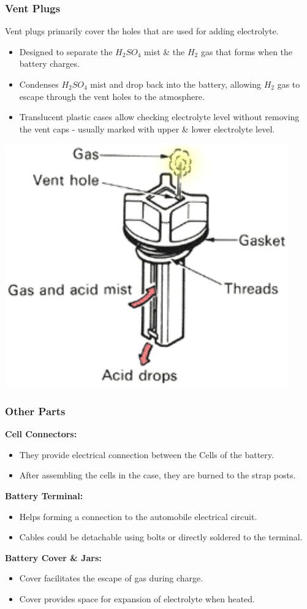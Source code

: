\documentclass{beamer}
\begin{document}
\begin{frame}    %
  \frametitle{Vent Plugs}
  \fontsize{7pt}{10}\selectfont
  
  \begin{center}
    Vent plugs primarily cover the holes that are used for adding electrolyte.
  \end{center}
  
  \begin{itemize}
    \item Designed to separate the $H_{2}SO_{4}$ mist \& the $H_{2}$ gas that forms when the battery charges.
    \item Condenses $H_{2}SO_{4}$ mist and drop back into the battery, allowing $H_{2}$ gas to escape through the vent holes to the atmosphere.
    \item Translucent plastic cases allow checking electrolyte level without removing the vent caps - usually marked with upper \& lower electrolyte level.
  \end{itemize}
  
  \begin{center}
    \includegraphics[width=0.4\linewidth]{./Resources/Images/vent_plug.jpg}
  \end{center}
  
\end{frame}

\begin{frame}    %
  \frametitle{Other Parts}
  \fontsize{10pt}{16}\selectfont

  \textbf{Cell Connectors:}  
  \begin{itemize}
    \item They provide electrical connection between the Cells of the battery.
    \item After assembling the cells in the case, they are burned to the strap posts.
  \end{itemize}
  
  \textbf{Battery Terminal:}
  \begin{itemize}
    \item Helps forming a connection to the automobile electrical circuit.
    \item Cables could be detachable using bolts or directly soldered to the terminal.
  \end{itemize}
  
  \textbf{Battery Cover \& Jars:}
  \begin{itemize}
    \item Cover facilitates the escape of gas during charge.
    \item Cover provides space for expansion of electrolyte when heated.
  \end{itemize}
\end{frame}
\end{document}
